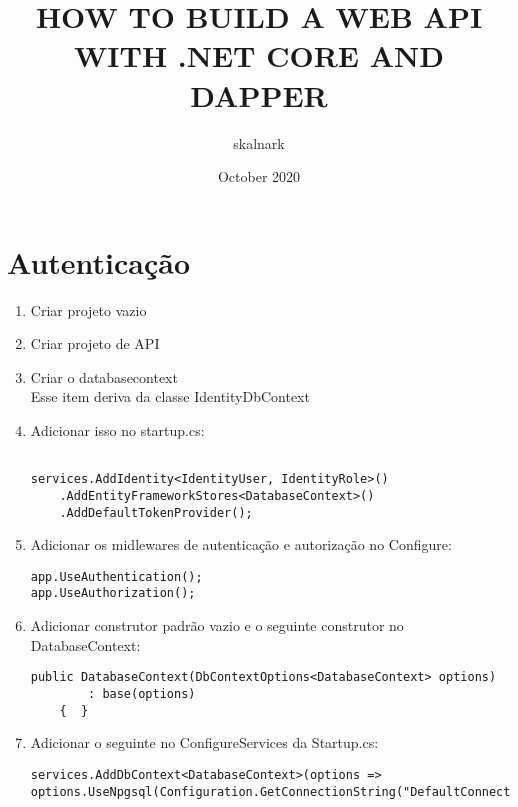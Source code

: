 \documentclass{article}
\title{HOW TO BUILD A WEB API WITH .NET CORE AND DAPPER}
\author{skalnark}
\date{October 2020}
\begin{document}
\maketitle

\section{Autenticação}

\begin{enumerate}
    \item Criar projeto vazio
    
    \item Criar projeto de API
    
    \item Criar o databasecontext\\
        Esse item deriva da classe IdentityDbContext
        
    \item Adicionar isso no startup.cs:
    
    \begin{verbatim}
    
services.AddIdentity<IdentityUser, IdentityRole>()
    .AddEntityFrameworkStores<DatabaseContext>()
    .AddDefaultTokenProvider();
    \end{verbatim}

    \item Adicionar os midlewares de autenticação e autorização no Configure:
    
    \begin{verbatim}
app.UseAuthentication();
app.UseAuthorization();
    \end{verbatim}

    \item Adicionar construtor padrão vazio e o seguinte construtor no DatabaseContext:
    
    \begin{verbatim}
public DatabaseContext(DbContextOptions<DatabaseContext> options)
        : base(options)
    {  }
    \end{verbatim}
    \item Adicionar o seguinte no ConfigureServices da Startup.cs:
    
    \begin{verbatim}
services.AddDbContext<DatabaseContext>(options =>
options.UseNpgsql(Configuration.GetConnectionString("DefaultConnection")));
    \end{verbatim}
    

\end{enumerate}
\end{document}
